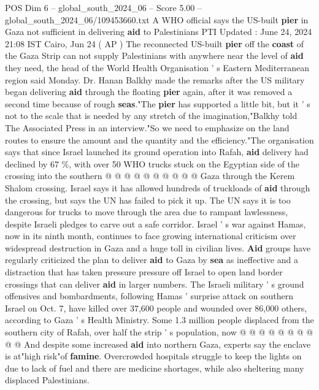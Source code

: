 \begin{textsample}{POS Dim 6 – global\_south\_2024\_06 – Score 5.00 – global\_south\_2024\_06/109453660.txt}  \label{ex:f6_pos_179}
A WHO official says the US-built \textbf{pier} in Gaza not sufficient in delivering \textbf{aid} to Palestinians PTI Updated : June 24, 2024 21:08 IST Cairo, Jun 24 ( AP ) The reconnected US-built \textbf{pier} off the \textbf{coast} of the Gaza Strip can not supply Palestinians with anywhere near the level of \textbf{aid} they need, the head of the World Health Organisation ' s Eastern Mediterranean region said Monday.
Dr.
Hanan Balkhy made the remarks after the US military began delivering \textbf{aid} through the floating \textbf{pier} again, after it was removed a second time because of rough \textbf{seas}."The \textbf{pier} has supported a little bit, but it ' s not to the scale that is needed by any stretch of the imagination,"Balkhy told The Associated Press in an interview."So we need to emphasize on the land routes to ensure the amount and the quantity and the efficiency."The organisation says that since Israel launched its ground operation into Rafah, \textbf{aid} delivery had declined by 67 \%, with over 50 WHO trucks stuck on the Egyptian side of the crossing into the southern @ @ @ @ @ @ @ @ @ @ Gaza through the Kerem Shalom crossing.
Israel says it has allowed hundreds of truckloads of \textbf{aid} through the crossing, but says the UN has failed to pick it up.
The UN says it is too dangerous for trucks to move through the area due to rampant lawlessness, despite Israeli pledges to carve out a safe corridor.
Israel ' s war against Hamas, now in its ninth month, continues to face growing international criticism over widespread destruction in Gaza and a huge toll in civilian lives. \textbf{Aid} groups have regularly criticized the plan to deliver \textbf{aid} to Gaza by \textbf{sea} as ineffective and a distraction that has taken pressure pressure off Israel to open land border crossings that can deliver \textbf{aid} in larger numbers.
The Israeli military ' s ground offensives and bombardments, following Hamas ' surprise attack on southern Israel on Oct. 7, have killed over 37,600 people and wounded over 86,000 others, according to Gaza ' s Health Ministry.
Some 1.3 million people displaced from the southern city of Rafah, over half the strip ' s population, now @ @ @ @ @ @ @ @ @ @ And despite some increased \textbf{aid} into northern Gaza, experts say the enclave is at"high risk"of \textbf{famine}.
Overcrowded hospitals struggle to keep the lights on due to lack of fuel and there are medicine shortages, while also sheltering many displaced Palestinians.

\end{textsample}
